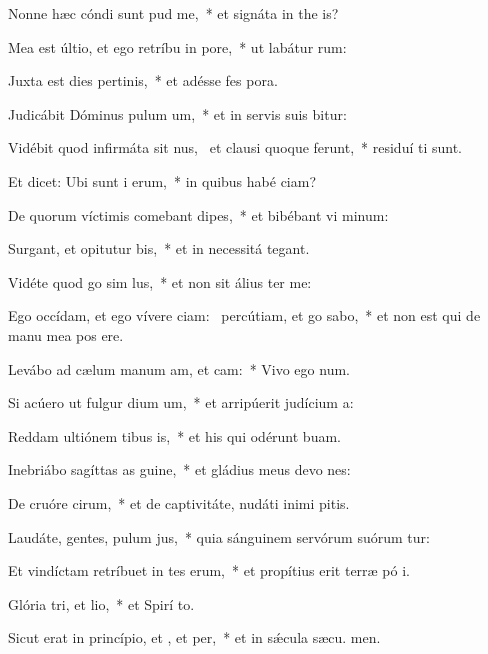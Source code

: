 \item Nonne hæc cóndi sunt pud me,~* et signáta in the is?
\item Mea est últio, et ego retríbu in pore,~* ut labátur  rum:
\item Juxta est dies pertinis,~* et adésse fes pora.
\item Judicábit Dóminus pulum um,~* et in servis suis bitur:
\item Vidébit quod infirmáta sit nus,~\pscross{} et clausi quoque ferunt,~* residuí ti sunt.
\item Et dicet: Ubi sunt i erum,~* in quibus habé ciam?
\item De quorum víctimis comebant dipes,~* et bibébant vi minum:
\item Surgant, et opitutur bis,~* et in necessitá  tegant.
\item Vidéte quod go sim lus,~* et non sit álius  ter me:
\item Ego occídam, et ego vívere ciam:~\pscross{} percútiam, et go sabo,~* et non est qui de manu mea pos ere.
\item Levábo ad cælum manum am, et cam:~* Vivo ego  num.
\item Si acúero ut fulgur dium um,~* et arripúerit judícium  a:
\item Reddam ultiónem tibus is,~* et his qui odérunt  buam.
\item Inebriábo sagíttas as guine,~* et gládius meus devo nes:
\item De cruóre cirum,~* et de captivitáte, nudáti inimi pitis.
\item Laudáte, gentes, pulum jus,~* quia sánguinem servórum suórum tur:
\item Et vindíctam retríbuet in tes erum,~* et propítius erit terræ pó i.
\item \singlecolsep
\item Glória tri, et lio,~* et Spirí to.
\item Sicut erat in princípio, et , et per,~* et in sǽcula sæcu. men.
